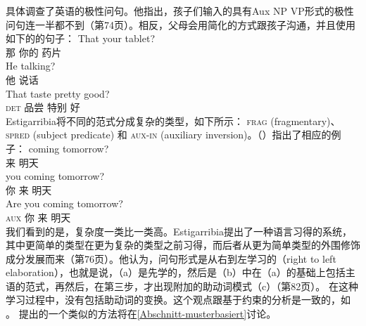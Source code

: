  \citet{Estigarribia2009a}具体调查了英语的极性问句。他指出，孩子们输入的具有Aux NP VP形式的极性问句连一半都不到（第74页）。相反，父母会用简化的方式跟孩子沟通，并且使用如下的的句子：
\eal
\ex 
\gll That your tablet?\\
那 你的 药片\\
\ex 
\gll He talking?\\
他 说话\\
\ex 
\gll That taste pretty good?\\
\textsc{det} 品尝 特别 好\\
\zl
Estigarribia将不同的范式分成复杂的类型，如下所示：
\textsc{frag}
(fragmentary)、\textsc{spred} (subject predicate) 和 \textsc{aux-in} (auxiliary
  inversion)。（）指出了相应的例子：
\eal\settowidth{}
\ex 
\gll coming tomorrow?         \\
来 明天\\
\ex 
\gll you coming tomorrow?     \\
你 来 明天\\
\ex 
\gll Are you coming tomorrow? \\
\textsc{aux} 你 来 明天\\
\zl
我们看到的是，复杂度一类比一类高。Estigarribia提出了一种语言习得的系统，其中更简单的类型在更为复杂的类型之前习得，而后者从更为简单类型的外围修饰成分发展而来（第76页）。他认为，问句形式是从右到左学习的（right to left elaboration），也就是说，（a）是先学的，然后是（b）中在（a）的基础上包括主语的范式，再然后，在第三步，才出现附加的助动词模式（c）（第82页）。
在这种学习过程中，没有包括助动词的变换。这个观点跟基于约束的分析是一致的，如 \citet{GSag2000a-u}。 \citet*{FPAG2007a}提出的一个类似的方法将在\ref{Abschnitt-musterbasiert}讨论。
